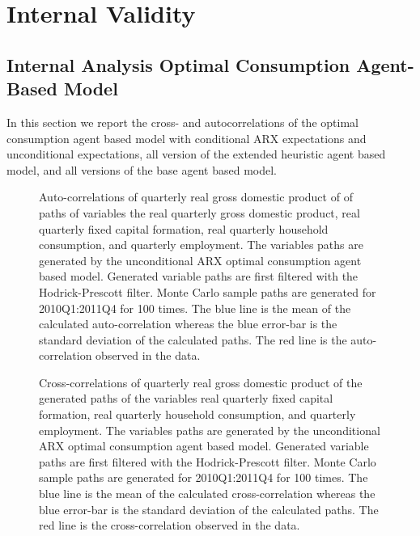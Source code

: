
\section{Internal Validity} %

\label{Internal Validity} %
\subsection{Internal Analysis Optimal Consumption Agent-Based Model}
In this section we report the cross- and autocorrelations of the optimal consumption agent based model with conditional ARX expectations and unconditional expectations, all version of the extended heuristic agent based model, and all versions of the base agent based model.

\begin{figure}[h!]
    \centering
    
		\caption{Auto-correlations of quarterly real gross domestic product of of paths of variables the real quarterly gross domestic product, real quarterly fixed capital formation, real quarterly household consumption, and quarterly employment. The variables paths are generated by the unconditional ARX optimal consumption agent based model. Generated variable paths are first filtered with the Hodrick-Prescott filter. Monte Carlo sample paths are generated for 2010Q1:2011Q4 for 100 times. The blue line is the mean of the calculated auto-correlation whereas the blue error-bar is the standard deviation of the calculated paths. The red line is the auto-correlation observed in the data. }
    \label{fig:autocorr-oc-abmx-uf}
\end{figure}


\begin{figure}[!h]
    \centering
      
    \caption{Cross-correlations of quarterly real gross domestic product of the generated paths of the variables real quarterly fixed capital formation, real quarterly household consumption, and quarterly employment. The variables paths are generated by the unconditional ARX optimal consumption agent based model. Generated variable paths are first filtered with the Hodrick-Prescott filter. Monte Carlo sample paths are generated for 2010Q1:2011Q4 for 100 times. The blue line is the mean of the calculated cross-correlation whereas the blue error-bar is the standard deviation of the calculated paths. The red line is the cross-correlation observed in the data.}
    \label{fig:crosscorr-oc-abmx-uf}
\end{figure}

